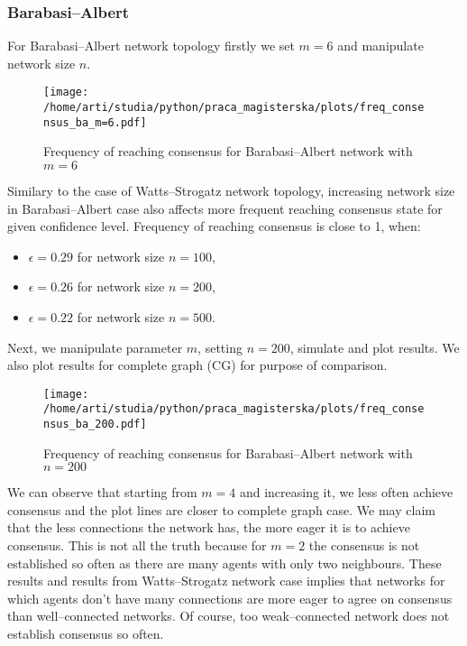 \documentclass{article}
\begin{document}
\subsubsection{Barabasi--Albert}

For Barabasi--Albert network topology firstly we set $m=6$ and manipulate network size $n$.

\begin{figure}[H]
		\centering
		\texttt{[image: /home/arti/studia/python/praca\_magisterska/plots/freq\_consensus\_ba\_m=6.pdf]}
		\caption{Frequency of reaching consensus for Barabasi--Albert network with $m=6$}
\end{figure}

Similary to the case of Watts--Strogatz network topology, increasing network size in Barabasi--Albert case also affects more frequent reaching consensus state for given confidence level. Frequency of reaching consensus is close to 1, when:
\begin{itemize}
\item  $\epsilon=0.29$ for network size $n=100$,
\item  $\epsilon=0.26$ for network size $n=200$,
\item  $\epsilon=0.22$ for network size $n=500$.
\end{itemize}
\indent

Next, we manipulate parameter $m$, setting $n=200$, simulate and plot results. We also plot results for complete graph (CG) for purpose of comparison.

\begin{figure}[H]
		\centering
		\texttt{[image: /home/arti/studia/python/praca\_magisterska/plots/freq\_consensus\_ba\_200.pdf]}
		\caption{Frequency of reaching consensus for Barabasi--Albert network with $n=200$}
		\label{freq_ba}
\end{figure}

We can observe that starting from $m=4$ and increasing it, we less often achieve consensus and the plot lines are closer to complete graph case. We may claim that the less connections the network has, the more eager it is to achieve consensus. This is not all the truth because for $m=2$ the consensus is not established so often as there are many agents with only two neighbours. These results and results from Watts--Strogatz network case implies that networks for which agents don't have many connections are more eager to agree on consensus than well--connected networks. Of course, too weak--connected network does not establish consensus so often.
\end{document}
